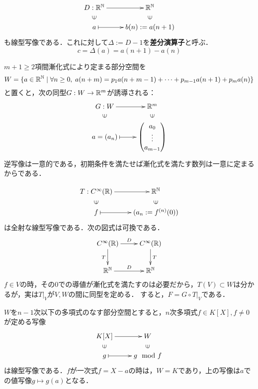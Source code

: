 \documentclass[uplatex, 12pt, dvipdfmx]{jsreport}
\begin{document}
\begin{example}[差分演算子]
    \[\xymatrix@R-2pc{
        D:\R^\N\ar[r]&\R^\N\\
        \rotatebox[origin=c]{90}{$\in$}&\rotatebox[origin=c]{90}{$\in$}\\
        a\ar@{|->}[r]&b(n):=a(n+1)
    }\]
    も線型写像である．これに対して$\Delta:=D-1$を\textbf{差分演算子}と呼ぶ．
    \[ c=\Delta(a)=a(n+1)-a(n) \]

    $m+1\ge 2$項間漸化式により定まる部分空間を
    \[ W=\{a\in\mathbb{R}^{\mathbb{N}}\mid\forall n\ge 0,\; a(n+m)=p_1a(n+m-1)+\cdots+p_{m-1}a(n+1)+p_ma(n)\} \]
    と置くと，次の同型$G:W\to\mathbb{R}^m$が誘導される：
    \[\xymatrix@R-2pc{
        G:W\ar[r]&\R^m\\
        \rotatebox[origin=c]{90}{$\in$}&\rotatebox[origin=c]{90}{$\in$}\\
        a=(a_n)\ar@{|->}[r]&{\begin{pmatrix}a_0\\\vdots\\a_{m-1}\end{pmatrix}}
    }\]
    逆写像は一意的である，初期条件を満たせば漸化式を満たす数列は一意に定まるからである．
\end{example}

\begin{example}[係数列と冪級数の同型]
    \[\xymatrix@R-2pc{
        T:C^\infty(\R)\ar[r]&\R^\N\\
        \rotatebox[origin=c]{90}{$\in$}&\rotatebox[origin=c]{90}{$\in$}\\
        f\ar@{|->}[r]&(a_n:=f^{(n)}(0))
    }\]
    は全射な線型写像である．次の図式は可換である．
    \[\xymatrix{
        C^\infty(\R)\ar[r]^-D\ar[d]_-T&C^\infty(\R)\ar[d]^-T\\
        \R^\N\ar[r]^-D&\R^\N
    }\]
    $f\in V$の時，その$0$での導値が漸化式を満たすのは必要だから，$T(V)\subset W$は分かるが，実は$T|_V$が$V,W$の間に同型を定める．
    すると，$F=G\circ T|_V$である．
\end{example}

\begin{example}[多項式の剰余]
    $W$を$n-1$次以下の多項式のなす部分空間とすると，$n$次多項式$f\in K[X],f\ne 0$が定める写像
    \[\xymatrix@R-2pc{
        K[X]\ar[r]&W\\
        \rotatebox[origin=c]{90}{$\in$}&\rotatebox[origin=c]{90}{$\in$}\\
        g\ar@{|->}[r]&{g\mod f}
    }\]
    は線型写像である．$f$が一次式$f=X-a$の時は，$W=K$であり，上の写像は$a$での値写像$g\mapsto g(a)$となる．
\end{example}
\end{document}
